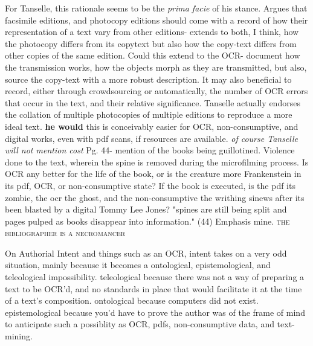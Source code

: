 \documentclass[course, english]{Notes}
\newcommand{\n}{\scalebox{2}{\textbf{\framebox{$\aleph$} } } }
\begin{document}
\begin{outline}
		\3 For Tanselle, this rationale seems to be the \emph{prima facie} of his stance.
\1 Argues that facsimile editions, and photocopy editions should come with a record of how their representation of a text vary from other editions- extends to both, I think, how the photocopy differs from its copytext but also how the copy-text differs from other copies of the same edition. 
	\2 \n Could this extend to the OCR- document how the transmission works, how the objects morph as they are transmitted, but also, source the copy-text with a more robust description. 
		\3 It may also beneficial to record, either through crowdsourcing or automatically, the number of OCR errors that occur in the text, and their relative significance. 
	\2 Tanselle actually endorses the collation of multiple photocopies of multiple editions to reproduce a more ideal text. \textbf{he would}
		\3 \n this is conceivably easier for OCR, non-consumptive, and digital works, even with pdf scans, if resources are available. \emph{of course Tanselle will not mention cost}
\1 Pg. 44- mention of the books being guillotined. Violence done to the text, wherein the spine is removed during the microfilming process. 
	\2 \n Is OCR any better for the life of the book, or is the creature more Frankenstein in its pdf, OCR, or non-consumptive state? If the book is executed, is the pdf its zombie, the ocr the ghost, and the non-consumptive the writhing sinews after its been blasted by a digital Tommy Lee Jones?
		\3 "spines are still being split and pages pulped as books disappear into \textsf{information}." (44) Emphasis mine.
		\3 \textsc{the bibliographer is a necromancer}
		
\1 \n On Authorial Intent and things such as an OCR, intent takes on a very odd situation, mainly because it becomes a ontological, epistemological, and teleological impossibility.
	\2 teleological because there was not a way of preparing a text to be OCR'd, and no standards in place that would facilitate it at the time of a text's composition.
	\2 ontological because computers did not exist.
	\2 epistemological because you'd have to prove the author was of the frame of mind to anticipate such a possiblity as OCR, pdfs, non-consumptive data, and text-mining. 
\end{outline}
\end{document}
